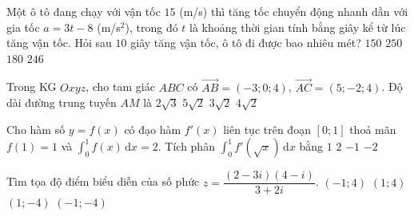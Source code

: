\begin{ex}%
	Một ô tô đang chạy với vận tốc $15$ (m/s) thì tăng tốc chuyển động nhanh dần với gia tốc $a=3t-8$ (m/s$^{2}$), trong đó $t$ là khoảng thời gian tính bằng giây kể từ lúc tăng vận tốc. Hỏi sau $10$ giây tăng vận tốc, ô tô đi được bao nhiêu mét?
	\choice
	{$150$}
	{\True $250$}
	{$180$}
	{$246$}
\end{ex}

\begin{ex}%
	Trong KG $Oxyz$, cho tam giác $ABC$ có $\overrightarrow{AB}=(-3; 0; 4)$, $\overrightarrow{AC}=(5;-2; 4)$. Độ dài đường trung tuyến $AM$ là
	\choice
	{$2\sqrt{3}$}
	{$5\sqrt{2}$}
	{\True $3\sqrt{2}$}
	{$4\sqrt{2}$}
\end{ex}
\begin{ex}%
	Cho hàm số $y=f(x)$ có đạo hàm $f'(x)$ liên tục trên đoạn $[0; 1]$ thoả mãn $f(1)=1$ và $\displaystyle\int_{0}^{1} f(x)\mathrm{\,d}x=2$. Tích phân $\displaystyle\int_{0}^{1} f'(\sqrt{x})\mathrm{\,d}x$ bằng
	\choice
	{$1$}
	{$2$}
	{$-1$}
	{\True $-2$}
\end{ex}

\begin{ex}%
	Tìm tọa độ điểm biểu diễn của số phức $z=\dfrac{(2-3i)(4-i)}{3+2i}$.
	\choice
	{$(-1; 4)$}
	{$(1; 4)$}
	{$(1;-4)$}
	{\True $(-1;- 4)$}
\end{ex}

